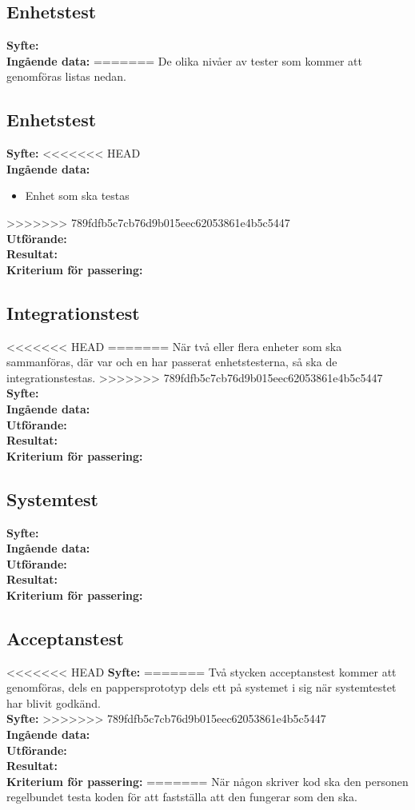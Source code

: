 \documentclass[a4paper,10pt]{article}
\begin{document}
\subsection{Enhetstest}
   \textbf{Syfte:}
    \\ \textbf{Ingående data:}
=======
De olika nivåer av tester som kommer att genomföras listas nedan.
\subsection{Enhetstest}
\label{sec:Enhetstest}
  \textbf{Syfte:}
<<<<<<< HEAD
    \\ \textbf{Ingående data:}
    \begin{itemize}
        \item Enhet som ska testas
    \end{itemize}
>>>>>>> 789fdfb5c7cb76d9b015eec62053861e4b5c5447
    \\ \textbf{Utförande:}
    \\ \textbf{Resultat:}
    \\ \textbf{Kriterium för passering:}
\subsection{Integrationstest}
<<<<<<< HEAD
=======
När två eller flera enheter som ska sammanföras, där var och en har passerat enhetstesterna, så ska de integrationstestas.
>>>>>>> 789fdfb5c7cb76d9b015eec62053861e4b5c5447
   \textbf{Syfte:}
    \\ \textbf{Ingående data:}
    \\ \textbf{Utförande:}
    \\ \textbf{Resultat:}
    \\ \textbf{Kriterium för passering:}
\subsection{Systemtest}
   \textbf{Syfte:}
    \\ \textbf{Ingående data:}
    \\ \textbf{Utförande:}
    \\ \textbf{Resultat:}
    \\ \textbf{Kriterium för passering:}
\subsection{Acceptanstest}
<<<<<<< HEAD
   \textbf{Syfte:}
=======
Två stycken acceptanstest kommer att genomföras, dels en pappersprototyp dels ett på systemet i sig när systemtestet har blivit godkänd.
    \\ \textbf{Syfte:}
>>>>>>> 789fdfb5c7cb76d9b015eec62053861e4b5c5447
    \\ \textbf{Ingående data:}
    \\ \textbf{Utförande:}
    \\ \textbf{Resultat:}
    \\ \textbf{Kriterium för passering:}
=======
  När någon skriver kod ska den personen regelbundet testa koden för att fastställa att den fungerar som den ska.
\end{document}
